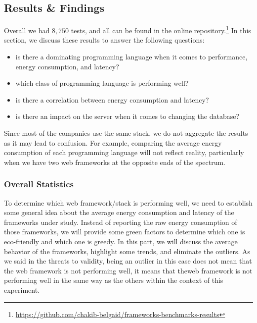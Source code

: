 \subsection{Results \& Findings}
Overall we had $8,750$ tests, and all can be found in the online repository.\footnote{\url{https://github.com/chakib-belgaid/frameworks-benchmarks-results}}
In this section, we discuss these results to answer the following questions:
\begin{itemize}
    \item is there a dominating programming language when it comes to performance, energy consumption, and latency?
    \item which class of programming language is performing well?
    \item is there a correlation between energy consumption and latency?
    \item is there an impact on the server when it comes to changing the database?
\end{itemize}

Since most of the companies use the same stack, we do not aggregate the results as it may lead to confusion.
For example, comparing the average energy consumption of each programming language will not reflect reality, particularly when we have two web frameworks at the opposite ends of the spectrum.

\subsubsection{Overall Statistics}
To determine which web framework/stack is performing well, we need to establish some general idea about the average energy consumption and latency of the frameworks under study.
Instead of reporting the raw energy consumption of those frameworks, we will provide some green factors to determine which one is eco-friendly and which one is greedy.
In this part, we will discuss the average behavior of the frameworks, highlight some trends, and eliminate the outliers.
As we said in the threats to validity, being an outlier in this case does not mean that the web framework is not performing well, it means that theweb framework is not performing well in the same way as the others within the context of this experiment.

